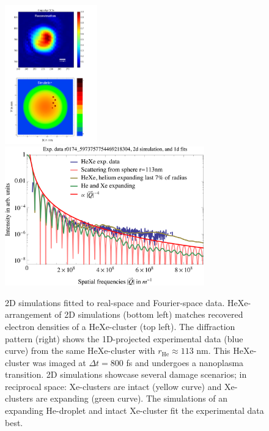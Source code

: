 \begin{figure}
	\centering
		\includegraphics[height=6.0cm]{images/results/HeXe-densities-113-05-doping-and-reconstruction.png}
		\includegraphics[height=6.0cm]{images/results/HeXe-cluster-113-0-5-doping2.png}
	\caption[Simulation and exp. data: Structural damage in He-droplet.]{2D simulations fitted to real-space and Fourier-space data. HeXe-arrangement of 2D simulations (bottom left) matches recovered electron densities of a HeXe-cluster (top left). The diffraction pattern (right) shows the 1D-projected experimental data (blue curve) from the same HeXe-cluster with $r_{\text{He}}\approx 113$ nm. This HeXe-cluster was imaged at $\Delta t=800$ fs and undergoes a nanoplasma transition. 2D simulations showcase several damage scenarios; in reciprocal space: Xe-clusters are intact (yellow curve) and Xe-clusters are expanding (green curve). The simulations of an expanding He-droplet and intact Xe-cluster fit the experimental data best.}
	\label{fig:HeXe-cluster-113-0.5}
\end{figure}
